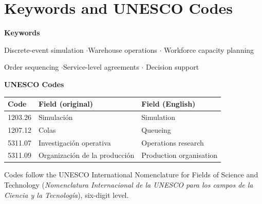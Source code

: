 \chapter*{Keywords and UNESCO Codes}

\vspace{0.4cm}
\noindent\textbf{Keywords}
\vspace{0.3cm}

\noindent
Discrete-event simulation \quad$\cdot$\quad Warehouse operations \quad$\cdot$\quad
Workforce capacity planning

\vspace{0.15cm}
\noindent
Order sequencing \quad$\cdot$\quad Service-level agreements \quad$\cdot$\quad
Decision support

\vspace{1.2cm}
\noindent\textbf{UNESCO Codes}
\vspace{0.3cm}

\noindent
\begin{tabularx}{\textwidth}{llX}
\toprule
\textbf{Code} & \textbf{Field (original)} & \textbf{Field (English)} \\
\midrule
1203.26 & Simulaci\'on & Simulation \\
1207.12 & Colas & Queueing \\
5311.07 & Investigaci\'on operativa & Operations research \\
5311.09 & Organizaci\'on de la producci\'on & Production organisation \\
\bottomrule
\end{tabularx}

\vspace{0.6cm}
\noindent\footnotesize
Codes follow the UNESCO International Nomenclature for Fields of Science and Technology
(\emph{Nomenclatura Internacional de la UNESCO para los campos de la Ciencia y la
Tecnolog\'ia}), six-digit level.
